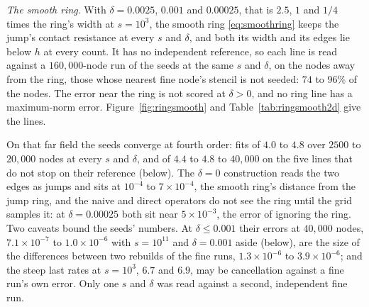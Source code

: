 \documentclass[11pt]{amsart}
\theoremstyle{definition}
\theoremstyle{remark}
\newcommand{\para}[1]{\par\smallskip\noindent\textit{#1}.\enspace}
\newcommand{\sci}[2]{#1 \times 10^{#2}}
\begin{document}
\begin{table}
  \centering
  \caption{Case 3 at $\delta = 0$: the RMS error of the seeds, with and
  without the flux seeds, over the jump-aware operator's at each count, all
  against the port's reference at each $s$; the two fits over $1250$ to
  $40{,}000$ nodes; and the line's own RMS error at $80{,}000$ nodes.}
  \label{tab:ring2d}
  \footnotesize
  
\end{table}

\para{The smooth ring}
With $\delta = 0.0025$, $0.001$ and $0.00025$, that is $2.5$, $1$ and $1/4$
times the ring's width at $s = 10^3$, the smooth ring \eqref{eq:smoothring}
keeps the jump's contact resistance at every $s$ and $\delta$, and both its
width and its edges lie below $h$ at every count. It has no independent
reference, so each line is read against a $160{,}000$-node run of the seeds
at the same $s$ and $\delta$, on the nodes away from the ring, those whose
nearest fine node's stencil is not seeded: $74$ to $96\%$ of the nodes. The
error near the ring is not scored at $\delta > 0$, and no ring line has a
maximum-norm error. Figure~\ref{fig:ringsmooth} and
Table~\ref{tab:ringsmooth2d} give the lines.

On that far field the seeds converge at fourth order: fits of $4.0$ to $4.8$
over $2500$ to $20{,}000$ nodes at every $s$ and $\delta$, and of $4.4$ to
$4.8$ to $40{,}000$ on the five lines that do not stop on their reference
(below). The $\delta = 0$ construction reads the two edges as jumps and sits
at $10^{-4}$ to $\sci{7}{-4}$, the smooth ring's distance from the jump ring,
and the naive and direct operators do not see the ring until the grid
samples it: at $\delta = 0.00025$ both sit near $\sci{5}{-3}$, the error of
ignoring the ring. Two caveats bound the seeds' numbers. At
$\delta \le 0.001$ their errors at $40{,}000$ nodes, $\sci{7.1}{-7}$ to
$\sci{1.0}{-6}$ with $s = 10^{11}$ and $\delta = 0.001$ aside (below),
are the size of the differences between two rebuilds of the
fine runs, $\sci{1.3}{-6}$ to $\sci{3.9}{-6}$; and the steep last rates at
$s = 10^3$, $6.7$ and $6.9$, may be cancellation against a fine run's own
error. Only one $s$ and $\delta$ was read against a second, independent fine
run.
\end{document}
